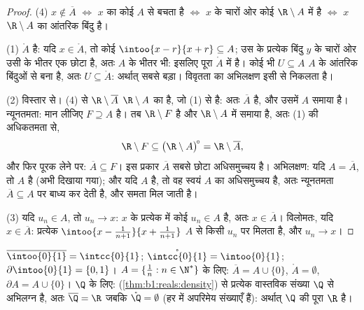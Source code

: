 \begin{proof}
(4) $x \notin \overline A$ $\iff$ $x$ का कोई  $A$ से बचता है $\iff$
$x$ के चारों ओर कोई  $\R \setminus A$ में है $\iff$ $x$ $\R \setminus
A$ का आंतरिक बिंदु है।

(1) $\mathring A$  है: यदि $x \in \mathring A$, तो कोई
$\intoo{x-r}{x+r} \subseteq A$; उस  के प्रत्येक बिंदु $y$ के चारों ओर
उसी के भीतर एक छोटा  है, अतः $A$ के भीतर भी: इसलिए पूरा 
$\mathring A$ में है। कोई भी  $U \subseteq A$ $A$ के आंतरिक बिंदुओं से
बना है, अतः $U \subseteq \mathring A$: अर्थात् सबसे बड़ा। विवृतता का
अभिलक्षण इसी से निकलता है।

(2) विस्तार से। (4) से $\R \setminus \overline A$ $\R \setminus A$ का
 है, जो (1) से  है: अतः $\overline A$  है, और उसमें
$A$ समाया है। न्यूनतमता: मान लीजिए $F \supseteq A$  है। तब $\R
\setminus F$  है और $\R \setminus A$ में समाया है, अतः (1) की अधिकतमता
से,
\[
\R \setminus F \subseteq \bigl(\R \setminus A\bigr)^{\!\circ}
= \R \setminus \overline A ,
\]
और फिर पूरक लेने पर: $\overline A \subseteq F$। इस प्रकार $\overline A$ सबसे
छोटा  अधिसमुच्चय है। अभिलक्षण: यदि $A = \overline A$, तो $A$  है
(अभी दिखाया गया); और यदि $A$  है, तो वह स्वयं $A$ का  अधिसमुच्चय
है, अतः न्यूनतमता $\overline A \subseteq A$ पर बाध्य कर देती है, और समता मिल
जाती है।

(3) यदि $u_n \in A$, तो $u_n \to x$: $x$ के प्रत्येक  में कोई $u_n
\in A$ है, अतः $x \in \overline A$। विलोमतः, यदि $x \in \overline A$:
प्रत्येक  $\intoo{x - \frac{1}{n+1}}{x + \frac{1}{n+1}}$ $A$ से किसी
$u_n$ पर मिलता है, और $u_n \to x$।
\end{proof}

\begin{example}\label{ex:b1:topology:closureexamples}
$\overline{\intoo{0}{1}} = \intcc{0}{1}$; $\mathring{\intcc{0}{1}} =
\intoo{0}{1}$; $\partial\intoo{0}{1} = \{0, 1\}$। $A = \{\frac 1n : n \in
\N^*\}$ के लिए: $\overline A = A \cup \{0\}$, $\mathring A = \emptyset$,
$\partial A = A \cup \{0\}$। $\Q$ के लिए: 
(\cref{thm:b1:reals:density}) से प्रत्येक वास्तविक संख्या $\Q$ से अभिलग्न
है, अतः $\overline{\Q} = \R$ जबकि $\mathring{\Q} = \emptyset$ (हर  में
अपरिमेय संख्याएँ हैं): अर्थात् $\Q$ की  पूरा $\R$ है।
\end{example}

